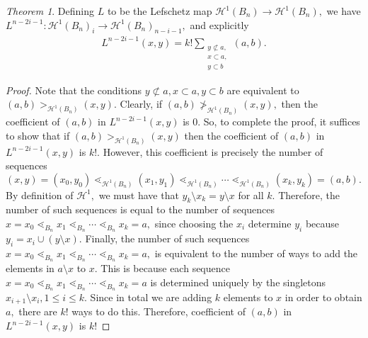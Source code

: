 \documentclass[10 pt]{amsart}
\theoremstyle{plain}
\theoremstyle{definition}
\theoremstyle{remark}
\numberwithin{equation}{section}
\newtheorem{thm}{Theorem}[section]
\theoremstyle{remark}
\newcommand\fbn{\mathcal H}
\begin{document}
\begin{thm}
\label{explicit_gbn_lefchetz}
Defining $L$ to be the Lefschetz map $\mathcal H^1(B_n) \rightarrow \mathcal H^1(B_n),$ we have $L^{n-2i-1}:\fbn^1(B_n)_i \rightarrow \fbn^1(B_n)_{n-i-1},$ and explicitly 
\begin{align*}
	L^{n-2i-1}(x, y)= k!\sum_{\substack{{y \not \subset a,}\\{x\subset a,}\\{y \subset b}}}^{}(a, b).
\end{align*}
\end{thm}
\begin{proof}
Note that the conditions $y \not \subset a, x\subset a, y\subset b$ are equivalent to $(a, b) >_{\mathcal H^1(B_n)} (x, y).$ Clearly, if $(a, b) \not >_{\mathcal H^1(B_n)} (x, y),$ then the coefficient of $(a, b)$ in $	L^{n-2i-1}(x, y)$ is 0. So, to complete the proof, it suffices to show that if  $(a, b) >_{\mathcal H^1(B_n)} (x, y)$ then the coefficient of $(a, b)$ in $	L^{n-2i-1}(x, y)$ is $k!$. However, this coefficient is precisely the number of sequences $(x, y) = (x_0, y_0) \lessdot_{\mathcal H^1(B_n)} (x_1, y_1) \lessdot_{\mathcal H^1(B_n)}  \cdots \lessdot_{\mathcal H^1(B_n)}  (x_k, y_k) = (a, b).$ By definition of $\mathcal H^1,$ we must have that $y_k \setminus x_k = y\setminus x$ for all $k.$ Therefore, the number of such sequences is equal to the number of sequences $x=x_0 \lessdot_{B_n} x_1 \lessdot_{B_n} \cdots \lessdot_{B_n} x_k = a,$ since choosing the $x_i$ determine $y_i$ because $y_i = x_i \cup (y \setminus x).$ Finally, the number of such sequences  $x=x_0 \lessdot_{B_n} x_1 \lessdot_{B_n} \cdots \lessdot_{B_n} x_k = a,$ is equivalent to the number of ways to add the elements in $a \setminus x$ to $x$. This is because each sequence $x=x_0 \lessdot_{B_n} x_1 \lessdot_{B_n} \cdots \lessdot_{B_n} x_k = a$ is determined uniquely by the singletons $x_{i+1} \setminus x_i, 1 \leq i \leq k.$ Since in total we are adding $k$ elements to $x$ in order to obtain $a,$ there are $k!$ ways to do this. Therefore, coefficient of $(a, b)$ in $	L^{n-2i-1}(x, y)$ is $k!$
\end{proof}
\end{document}
